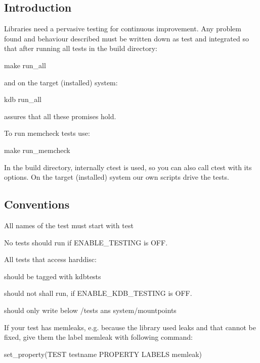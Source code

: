 \subsection*{Introduction}

Libraries need a pervasive testing for continuous improvement. Any problem found and behaviour described must be written down as test and integrated so that after running all tests in the build directory\+: \begin{DoxyVerb}make run_all
\end{DoxyVerb}


and on the target (installed) system\+: \begin{DoxyVerb}kdb run_all
\end{DoxyVerb}


assures that all these promises hold.

To run memcheck tests use\+: \begin{DoxyVerb}make run_memcheck
\end{DoxyVerb}


In the build directory, internally ctest is used, so you can also call ctest with its options. On the target (installed) system our own scripts drive the tests.

\subsection*{Conventions}


\begin{DoxyItemize}
\item All names of the test must start with test
\item No tests should run if E\+N\+A\+B\+L\+E\+\_\+\+T\+E\+S\+T\+I\+N\+G is O\+F\+F.
\item All tests that access harddisc\+:
\begin{DoxyItemize}
\item should be tagged with kdbtests
\item should not shall run, if E\+N\+A\+B\+L\+E\+\_\+\+K\+D\+B\+\_\+\+T\+E\+S\+T\+I\+N\+G is O\+F\+F.
\item should only write below /tests ans system/mountpoints
\end{DoxyItemize}
\item If your test has memleaks, e.\+g. because the library used leaks and that cannot be fixed, give them the label memleak with following command\+:

set\+\_\+property(\+T\+E\+S\+T testname P\+R\+O\+P\+E\+R\+T\+Y L\+A\+B\+E\+L\+S memleak)
\end{DoxyItemize}

